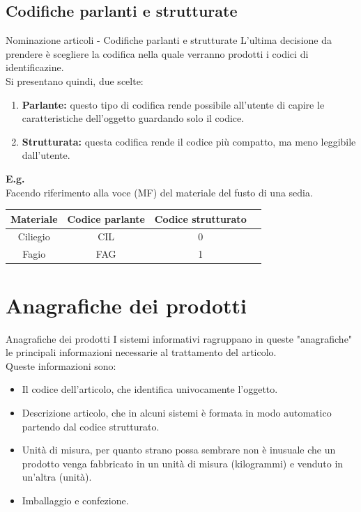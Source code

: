 \documentclass{beamer}
\begin{document}
    \subsection{Codifiche parlanti e strutturate}
    \begin{frame}{Nominazione articoli - Codifiche parlanti e strutturate}
        L'ultima decisione da prendere è scegliere la codifica nella quale verranno prodotti i codici di identificazine.\\
        Si presentano quindi, due scelte:
        \begin{enumerate}
            \item \textbf{Parlante:} questo tipo di codifica rende possibile all'utente di capire le caratteristiche dell'oggetto guardando solo il codice.
            \item \textbf{Strutturata:} questa codifica rende il codice più compatto, ma meno leggibile dall'utente.
        \end{enumerate}
        \textbf{E.g.}\\
        Facendo riferimento alla voce (MF) del materiale del fusto di una sedia.
        \begin{center}
            \begin{tabular}{|c|c|c|c|}
                \hline
                \textbf{Materiale} & \textbf{Codice parlante} & \textbf{Codice strutturato}\\
                \hline
                Ciliegio & CIL & 0\\
                \hline
                Fagio & FAG & 1\\
                \hline
            \end{tabular}
        \end{center}
    \end{frame}

    \section{Anagrafiche dei prodotti}
    \begin{frame}{Anagrafiche dei prodotti}
        I sistemi informativi ragruppano in queste "anagrafiche" le principali informazioni necessarie al trattamento del articolo.\\
        Queste informazioni sono:
        \begin{itemize}
            \item Il codice dell'articolo, che identifica univocamente l'oggetto.
            \item Descrizione articolo, che in alcuni sistemi è formata in modo automatico partendo dal codice strutturato.
            \item Unità di misura, per quanto strano possa sembrare non è inusuale che un prodotto venga fabbricato in un unità di misura (kilogrammi) e venduto in un'altra (unità).
            \item Imballaggio e confezione.
             
        \end{itemize}
    \end{frame}
\end{document}

